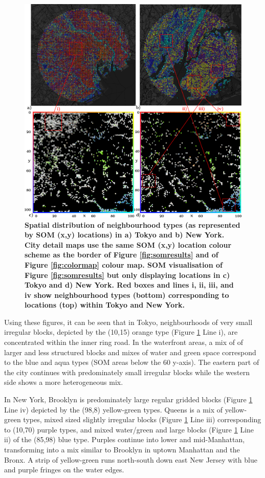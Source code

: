 \documentclass[9pt,twocolumn,twoside,lineno]{pnas-new}
\begin{document}
\begin{figure}
\centering
\includegraphics[width=.55\linewidth]{BlockTypologies_Figures5.png}
\caption{\bf Spatial distribution of neighbourhood types (as represented by SOM (x,y) locations) in a) Tokyo and b) New York. City detail maps use the same SOM (x,y) location colour scheme as the border of Figure \ref{fig:somresults} and of Figure \ref{fig:colormap} colour map. SOM visualisation of Figure \ref{fig:somresults} but only displaying locations in c) Tokyo and d) New York. Red boxes and lines i, ii, iii, and iv show neighbourhood types (bottom) corresponding to locations (top) within Tokyo and New York.}
 \label{fig:citylocations}
\end{figure} 

Using these figures, it can be seen that in Tokyo, neighbourhoods of very small irregular blocks, depicted by the (10,15) orange type (Figure \ref{fig:citylocations} Line i), are concentrated within the inner ring road. In the waterfront areas, a mix of of larger and less structured blocks and mixes of water and green space correspond to the blue and aqua types (SOM areas below the 60 y-axis). The eastern part of the city continues with predominately small irregular blocks while the western side shows a more heterogeneous mix. 

In New York, Brooklyn is predominately large regular gridded blocks (Figure \ref{fig:citylocations} Line iv) depicted by the (98,8) yellow-green types. Queens is a mix of yellow-green types, mixed sized slightly irregular blocks (Figure \ref{fig:citylocations} Line iii) corresponding to (10,70) purple types, and mixed water/green and large blocks (Figure \ref{fig:citylocations} Line ii) of the (85,98) blue type. Purples continue into lower and mid-Manhattan, transforming into a mix similar to Brooklyn in uptown Manhattan and the Bronx. A strip of yellow-green runs north-south down east New Jersey with blue and purple fringes on the water edges.
\end{document}

